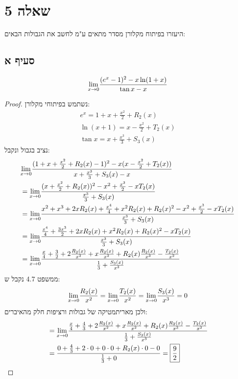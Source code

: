 \documentclass{article}
\begin{document}
	\pagebreak
	\section*{שאלה 5}
	היעזרו בפיתוח מקלורן מסדר מתאים ע"מ לחשב את הגבולות הבאים:
	\subsection*{סעיף א}
	\[	\displaystyle{\lim_{x \to 0}} \frac{(e^x-1)^2 - x \ln (1+x)}{\tan x - x}	\]
	\begin{proof}
		נשתמש בפיתוחי מקלורן:
		\begin{align*}
			e^x = 1 + x + \frac{x^2}{2} + R_2(x) \\
			\ln(x+1) = x - \frac{x^2}{2} + T_2(x) \\
			\tan x = x + \frac{x^3}{3} + S_3(x)
		\end{align*}
		נציב בגבול ונקבל:
		\begin{align*}
			&\displaystyle{\lim_{x \to 0}} \frac{(1 + x + \frac{x^2}{2} + R_2(x)-1)^2 - x (x - \frac{x^2}{2} + T_2(x))}{x + \frac{x^3}{3} + S_3(x) - x} \\
			&=\displaystyle{\lim_{x \to 0}} \frac{(x + \frac{x^2}{2} + R_2(x))^2 - x^2 + \frac{x^3}{2} - xT_2(x) }{\frac{x^3}{3} + S_3(x)} \\
			&=\displaystyle{\lim_{x \to 0}} \frac{x^2 + x^3 + 2xR_2(x) + \frac{x^4}{4} + x^2R_2(x) + R_2(x)^2 - x^2 + \frac{x^3}{2} - xT_2(x) }{\frac{x^3}{3} + S_3(x)} \\
			&=\displaystyle{\lim_{x \to 0}} \frac{\frac{x^4}{4} + \frac{3x^3}{2} + 2xR_2(x)  + x^2R_2(x) + R_2(x)^2 - xT_2(x) }{\frac{x^3}{3} + S_3(x)} \\
			&=\displaystyle{\lim_{x \to 0}} \frac{\frac{x}{4} + \frac{3}{2} + 2\frac{R_2(x)}{x^2}  + x\frac{R_2(x)}{x^2} + R_2(x)\frac{R_2(x)}{x^3} - \frac{T_2(x)}{x^2} }{\frac{1}{3} + \frac{S_3(x)}{x^3}} \\
		\end{align*}
		ממשפט 4.7 נקבל ש:
		\[
			\displaystyle{\lim_{x \to 0}} \frac{R_2(x)}{x^2} = \displaystyle{\lim_{x \to 0}} \frac{T_2(x)}{x^2} = \displaystyle{\lim_{x \to 0}} \frac{S_3(x)}{x^3} = 0
		\]
		ולכן מאריתמטיקה של גבולות ורציפות חלק מהאיברים:
		\begin{align*}
			&=\displaystyle{\lim_{x \to 0}} \frac{\frac{x}{4} + \frac{4}{3} + 2\frac{R_2(x)}{x^2}  + x\frac{R_2(x)}{x^2} + R_2(x)\frac{R_2(x)}{x^3} - \frac{T_2(x)}{x^2} }{\frac{1}{3} + \frac{S_3(x)}{x^3}} \\
			&=\frac{0 + \frac{4}{3} + 2 \cdot 0  + 0 \cdot 0 + R_2(x) \cdot 0 - 0 }{\frac{1}{3} + 0}
			= \boxed{\frac{9}{2}}
		\end{align*}
	\end{proof}
\end{document}
